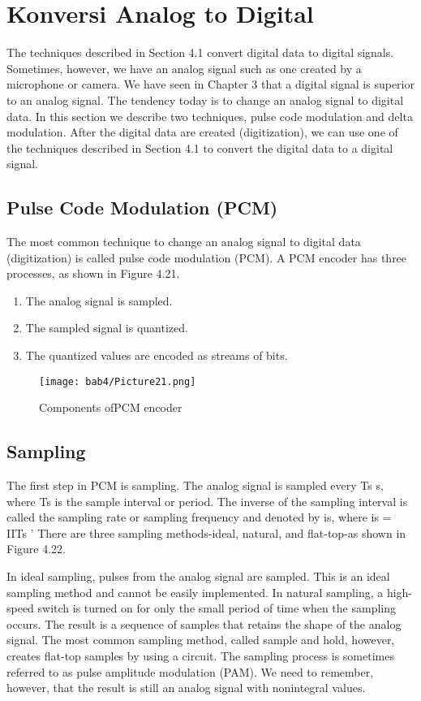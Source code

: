 \section{Konversi Analog to Digital}
The techniques described in Section 4.1 convert digital data to digital signals. Sometimes, however, we have an analog signal such as one created by a microphone or camera. We have seen in Chapter 3 that a digital signal is superior to an analog signal. The tendency today is to change an analog signal to digital data. In this section we describe two techniques, pulse code modulation and delta modulation. After the digital data are created (digitization), we can use one of the techniques described in Section 4.1 to convert the digital data to a digital signal.

\subsection{Pulse Code Modulation (PCM)}
The most common technique to change an analog signal to digital data (digitization) is called pulse code modulation (PCM). A PCM encoder has three processes, as shown in Figure 4.21.
\begin{enumerate}
  \item The analog signal is sampled.
  \item The sampled signal is quantized.
  \item The quantized values are encoded as streams of bits.
\end{enumerate}

\begin{figure}
  \centering
  \texttt{[image: bab4/Picture21.png]}
  \caption{Components ofPCM encoder}
  \label{fig4:21}
\end{figure}

\subsection*{Sampling}
The first step in PCM is sampling. The analog signal is sampled every Ts s, where Ts is the sample interval or period. The inverse of the sampling interval is called the sampling rate or sampling frequency and denoted by is, where is = IITs ' There are three sampling methods-ideal, natural, and flat-top-as shown in Figure 4.22.

In ideal sampling, pulses from the analog signal are sampled. This is an ideal sampling method and cannot be easily implemented. In natural sampling, a high-speed switch is turned on for only the small period of time when the sampling occurs. The result is a sequence of samples that retains the shape of the analog signal. The most common sampling method, called sample and hold, however, creates flat-top samples by using a circuit. The sampling process is sometimes referred to as pulse amplitude modulation (PAM). We need to remember, however, that the result is still an analog signal with nonintegral values.

